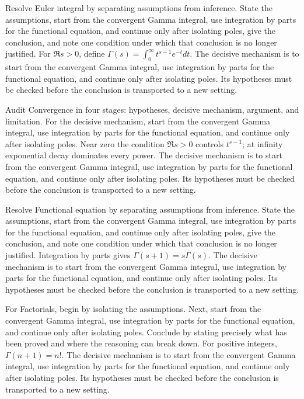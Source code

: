 \begin{example}\label{ex:iv19-worked-01}
Resolve Euler integral by separating assumptions from inference. State the assumptions, start from the convergent Gamma integral, use integration by parts for the functional equation, and continue only after isolating poles, give the conclusion, and note one condition under which that conclusion is no longer justified. For $\Re s>0$, define $\Gamma(s)=\int_0^\infty t^{s-1}e^{-t}dt$. The decisive mechanism is to start from the convergent Gamma integral, use integration by parts for the functional equation, and continue only after isolating poles. Its hypotheses must be checked before the conclusion is transported to a new setting.
\end{example}

\begin{example}\label{ex:iv19-worked-02}
Audit Convergence in four stages: hypotheses, decisive mechanism, argument, and limitation. For the decisive mechanism, start from the convergent Gamma integral, use integration by parts for the functional equation, and continue only after isolating poles. Near zero the condition $\Re s>0$ controls $t^{s-1}$; at infinity exponential decay dominates every power. The decisive mechanism is to start from the convergent Gamma integral, use integration by parts for the functional equation, and continue only after isolating poles. Its hypotheses must be checked before the conclusion is transported to a new setting.
\end{example}

\begin{example}\label{ex:iv19-worked-03}
Resolve Functional equation by separating assumptions from inference. State the assumptions, start from the convergent Gamma integral, use integration by parts for the functional equation, and continue only after isolating poles, give the conclusion, and note one condition under which that conclusion is no longer justified. Integration by parts gives $\Gamma(s+1)=s\Gamma(s)$. The decisive mechanism is to start from the convergent Gamma integral, use integration by parts for the functional equation, and continue only after isolating poles. Its hypotheses must be checked before the conclusion is transported to a new setting.
\end{example}

\begin{example}\label{ex:iv19-worked-04}
For Factorials, begin by isolating the assumptions. Next, start from the convergent Gamma integral, use integration by parts for the functional equation, and continue only after isolating poles. Conclude by stating precisely what has been proved and where the reasoning can break down. For positive integers, $\Gamma(n+1)=n!$. The decisive mechanism is to start from the convergent Gamma integral, use integration by parts for the functional equation, and continue only after isolating poles. Its hypotheses must be checked before the conclusion is transported to a new setting.
\end{example}

